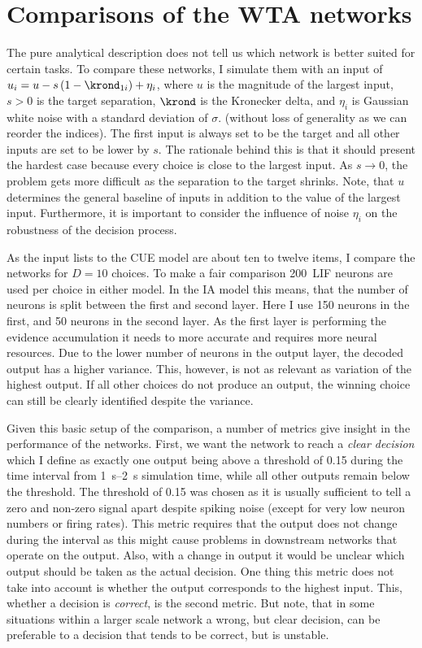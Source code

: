 \section{Comparisons of the WTA networks}
The pure analytical description does not tell us which network is better suited for certain tasks.
To compare these networks, I simulate them with an input of $u_i = u - s\del{1 - \krond_{1i}} + \eta_i$, where $u$ is the magnitude of the largest input, $s > 0$ is the target separation, $\krond$ is the Kronecker delta, and $\eta_i$ is Gaussian white noise with a standard deviation of $\sigma$.  (without loss of generality as we can reorder the indices).
The first input is always set to be the target and all other inputs are set to be lower by $s$.
The rationale behind this is that it should present the hardest case because every choice is close to the largest input.
As $s \rightarrow 0$, the problem gets more difficult as the separation to the target shrinks.
Note, that $u$ determines the general baseline of inputs in addition to the value of the largest input.
Furthermore, it is important to consider the influence of noise $\eta_i$ on the robustness of the decision process.

As the input lists to the CUE model are about ten to twelve items, I compare the networks for $D=10$ choices.
To make a fair comparison \num{200}~LIF neurons are used per choice in either model.
In the IA model this means, that the number of neurons is split between the first and second layer.
Here I use \num{150} neurons in the first, and \num{50} neurons in the second layer.
As the first layer is performing the evidence accumulation it needs to more accurate and requires more neural resources.
Due to the lower number of neurons in the output layer, the decoded output has a higher variance.
This, however, is not as relevant as variation of the highest output.
If all other choices do not produce an output, the winning choice can still be clearly identified despite the variance.

Given this basic setup of the comparison, a number of metrics give insight in the performance of the networks.
First, we want the network to reach a \emph{clear decision} which I define as exactly one output being above a threshold of \num{0.15} during the time interval from \SIrange{1}{2}{\second} simulation time, while all other outputs remain below the threshold.
The threshold of \num{0.15} was chosen as it is usually sufficient to tell a zero and non-zero signal apart despite spiking noise (except for very low neuron numbers or firing rates).
This metric requires that the output does not change during the interval as this might cause problems in downstream networks that operate on the output.
Also, with a change in output it would be unclear which output should be taken as the actual decision.
One thing this metric does not take into account is whether the output corresponds to the highest input.
This, whether a decision is \emph{correct}, is the second metric.
But note, that in some situations within a larger scale network a wrong, but clear decision, can be preferable to a decision that tends to be correct, but is unstable.

